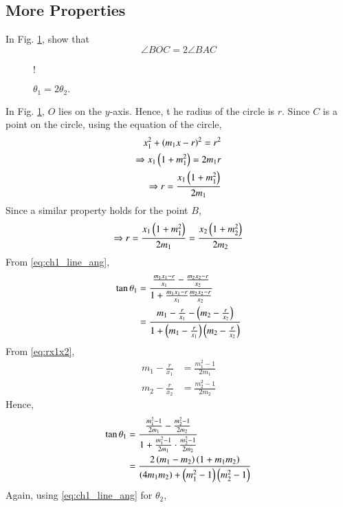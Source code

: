 \subsection{More Properties}
\begin{problem}
In Fig. \ref{fig:angle_arc}, show that 
\begin{equation}
\angle BOC = 2 \angle BAC
\end{equation}
\end{problem}
\begin{figure}[!h]
\centering
\resizebox {\columnwidth} {!} {

}
\caption{$\theta_1= 2 \theta_2.$}
\label{fig:angle_arc}
\end{figure}
%
\solution In Fig. \ref{fig:angle_arc}, $O$ lies on the $y$-axis.  Hence, t	he radius of the circle is $r$. Since $C$ is a point on the circle,
using the equation of the circle,
\begin{align}
x_1^2+\left(m_1x-r\right)^2 = r^2
\\
\Rightarrow x_1\left(1+m_1^2\right) = 2m_1 r
\\
\Rightarrow r = \frac{x_1\left(1+m_1^2\right)}{2m_1}
\end{align}
%
Since a similar property holds for the point $B$, 
\begin{equation}
\label{eq:rx1x2}
\Rightarrow r = \frac{x_1\left(1+m_1^2\right)}{2m_1} = \frac{x_2\left(1+m_2^2\right)}{2m_2} 
\end{equation}
From \eqref{eq:ch1_line_ang},
\begin{align}
\tan\theta_1 &= \frac{\frac{m_1x_1-r}{x_1}- \frac{m_2x_2-r}{x_2}}{1+\frac{m_1x_1-r}{x_1}\frac{m_2x_2-r}{x_2}}
\\
&= \frac{m_1-\frac{r}{x_1}- \left(m_2 - \frac{r}{x_2}\right)}{1+\left(m_1-\frac{r}{x_1}\right)\left(m_2-\frac{r}{x_2}\right)}
\end{align}
From \eqref{eq:rx1x2},
\begin{align}
m_1-\frac{r}{x_1} &= \frac{m_1^2-1}{2m_1}
\\
m_2-\frac{r}{x_2} &= \frac{m_2^2-1}{2m_2}
\end{align}
Hence,
\begin{align}
\tan\theta_1 &=  \frac{\frac{m_1^2-1}{2m_1}-\frac{m_2^2-1}{2m_2}}{1+\frac{m_1^2-1}{2m_1}\cdot\frac{m_2^2-1}{2m_2}}
\\
&= \frac{2\left(m_1-m_2\right)\left(1+m_1m_2\right)}{\left(4m_1m_2\right)+\left(m_1^2-1\right)\left(m_2^2-1\right)}
\end{align}
Again, using \eqref{eq:ch1_line_ang} for $\theta_2$,
